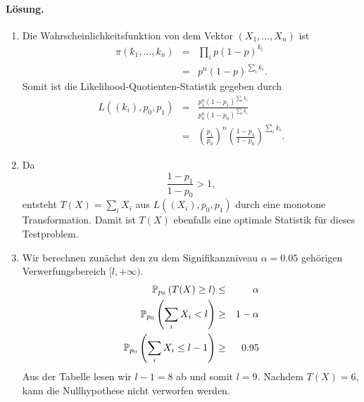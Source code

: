 \paragraph*{Lösung.}
\begin{enumerate}
    \item Die Wahrscheinlichkeitsfunktion von dem Vektor $\left( X_1, \ldots, X_n \right)$ ist
        \begin{eqnarray}
            \pi\left( k_1, \ldots, k_n \right) &=& \prod_i p(1-p)^{k_i} \\
            &=& p^n (1-p)^{\sum_{i}^{} k_i}.
        \end{eqnarray}
        Somit ist die Likelihood-Quotienten-Statistik gegeben durch
        \begin{eqnarray}
            L( (k_i), p_0, p_1) &=& \frac{p_1^n (1-p_1)^{\sum_{i} k_i}}{ p_0^n (1-p_0)^{\sum_{i} k_i}} \\
            &=& \left( \frac{p_1}{p_0} \right)^n \left( \frac{1-p_1}{1-p_0} \right)^{\sum_{i} k_i}.
        \end{eqnarray}
    \item Da 
        \begin{equation}
            \frac{1-p_1}{1-p_0} > 1,
        \end{equation}
        entsteht $T(X) = \sum_{i}^{} X_i$ aus $L( (X_i), p_0, p_1 )$ durch eine monotone Transformation.
        Damit ist $T(X)$ ebenfalls eine optimale Statistik für dieses Testproblem.
    \item Wir berechnen zunächst den zu dem Signifikanzniveau $\alpha=0.05$ gehörigen Verwerfungsbereich
        $[l, +\infty)$. 
        \begin{eqnarray}
            \mathbb P_{p_0} \left( T(X) \geq l \right) & \leq & \alpha \\
            \mathbb P_{p_0} \left( \sum_{i}^{} X_i < l \right) & \geq & 1-\alpha \\ 
            \mathbb P_{p_0} \left( \sum_{i}^{} X_i \leq l-1 \right) & \geq & 0.95 \\ 
        \end{eqnarray}
        Aus der Tabelle lesen wir $l-1=8$ ab und somit $l=9$. Nachdem $T(X)=6$, kann die Nullhypothese
        nicht verworfen werden.
\end{enumerate}






